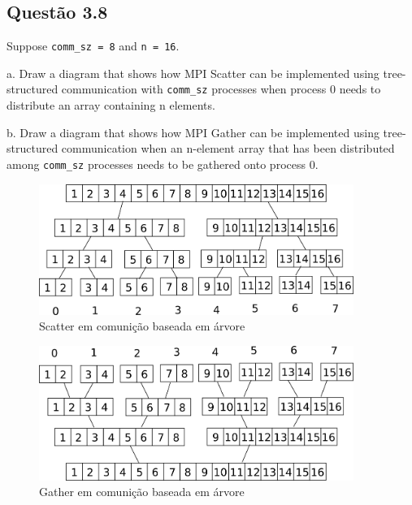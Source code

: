 

\subsection{Questão 3.8}

Suppose \texttt{comm\_sz = 8} and \texttt{n = 16}.

a. Draw a diagram that shows how MPI Scatter can be implemented using
tree-structured communication with \texttt{comm\_sz} processes when process 0 needs to distribute an array containing n elements.

b. Draw a diagram that shows how MPI Gather can be implemented using
tree-structured communication when an n-element array that has been distributed among \texttt{comm\_sz} processes needs to be gathered onto process 0.\\

\begin{figure}[h!]
  \begin{center}
    \includegraphics[width=290pt]{sections/q3.8/imgs/g1.png}
  \end{center}
  \caption{Scatter em comunição baseada em árvore}
  \label{fig:scattertree}
\end{figure}

\begin{figure}[h!]
  \begin{center}
    \includegraphics[width=290pt]{sections/q3.8/imgs/g2.png}
  \end{center}
  \caption{Gather em comunição baseada em árvore}
  \label{fig:gathertree}
\end{figure}




